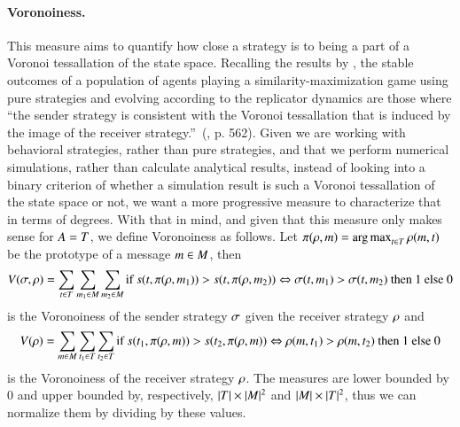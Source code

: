 \paragraph{Voronoiness.}
This measure aims to quantify how close a strategy is to being a part of a Voronoi tessallation of the state space.
Recalling the results by \cite{Jager2007}, the stable outcomes of a population of agents playing a similarity-maximization game using pure strategies and evolving according to the replicator dynamics are those where ``the sender strategy is consistent with the Voronoi tessallation that is induced by the image of the receiver strategy.''~(\cite{Jager2007}, p. 562).
Given we are working with behavioral strategies, rather than pure strategies, and that we perform numerical simulations, rather than calculate analytical results, instead of looking into a binary criterion of whether a simulation result is such a Voronoi tessallation of the state space or not, we want a more progressive measure to characterize that in terms of degrees.
With that in mind, and given that this measure only makes sense for $A = T$, we define Voronoiness as follows.
Let $\pi(\rho, m) = \operatorname*{arg\,max}_{t \in T}\rho(m,t)$ be the prototype of a message $m \in M$, then
\begin{multline*}
  V(\sigma, \rho) = \sum_{t \in T} \sum_{m_1 \in M} \sum_{m_2 \in M} \textrm{if } s(t, \pi(\rho, m_1)) > s(t, \pi(\rho, m_2)) \Leftrightarrow \sigma(t, m_1) > \sigma(t, m_2) \textrm{ then } 1 \textrm{ else } 0
\end{multline*}
is the Voronoiness of the sender strategy $\sigma$ given the receiver strategy $\rho$ and
\begin{align*}
  V(\rho) = \sum_{m \in M} \sum_{t_1 \in T} \sum_{t_2 \in T} \textrm{if } s(t_1, \pi(\rho, m)) > s(t_2, \pi(\rho, m)) \Leftrightarrow \rho(m, t_1) > \rho(m, t_2) \textrm{ then } 1 \textrm{ else } 0
\end{align*}
is the Voronoiness of the receiver strategy $\rho$.
The measures are lower bounded by $0$ and upper bounded by, respectively, $|T| \times |M|^2$ and $|M| \times |T|^2$, thus we can normalize them by dividing by these values.

